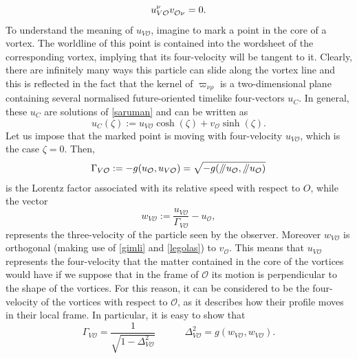 \documentclass[usenatbib%
]{mnras}
\newcommand{\spc}{\quad \quad \quad}
\newcommand{\paral}{\mathbin{ \, \!/\mkern-5mu/\!} \,}
\begin{document}
\begin{equation}\label{legolas}
u_{V{\mathcal{O}}}^\nu v\indices{_{\mathcal{O}} _\nu}=0.
\end{equation}
To understand the meaning of $u_{V{\mathcal{O}}}$, imagine to mark a point in the core of a vortex. The worldline of this point is contained into the wordsheet of the corresponding vortex, implying that its four-velocity will be tangent to it. Clearly, there are infinitely many ways this particle can slide along the vortex line and this is reflected in the fact that the kernel of $\varpi_{\nu \rho}$ is a two-dimensional plane containing several normalised future-oriented timelike four-vectors $u_{C}$. In general, these $u_{C}$ are solutions of \eqref{saruman} and can be written as
\begin{equation}
u_{C}(\zeta) := u_{V{\mathcal{O}}} \cosh(\zeta) + v_{\mathcal{O}}\sinh(\zeta).
\end{equation}
Let us impose that the marked point is moving with four-velocity $u_{V{\mathcal{O}}}$, which is the case $\zeta =0$. Then,
\begin{equation}\label{brillantino}
\Gamma_{V{\mathcal{O}}} := -g(u_{\mathcal{O}},u_{V{\mathcal{O}}}) = \sqrt{-g(\paral u_{\mathcal{O}},\paral u_{\mathcal{O}})} 
\end{equation} 
is the Lorentz factor associated with its relative speed with respect to $O$, while the vector
\begin{equation}\label{3velocity}
w_{V{\mathcal{O}}} := \dfrac{u_{V{\mathcal{O}}}}{\Gamma_{V{\mathcal{O}}}} - u_{\mathcal{O}},
\end{equation}
represents the three-velocity of the particle seen by the observer. Moreover  $w_{V{\mathcal{O}}}$ is orthogonal (making use of \eqref{gimli} and \eqref{legolas}) to $v_{\mathcal{O}}$. 
This means that $u_{V{\mathcal{O}}}$ represents the four-velocity that the matter contained in the core of the vortices would have if we suppose that in the frame of $\mathcal{O}$ its motion is perpendicular to the shape of the vortices. 
For this reason, it can be considered to be the four-velocity of the vortices with respect to $\mathcal{O}$, as it describes how their profile moves in their local frame. 
In particular, it is easy to show that
\begin{equation}
\Gamma_{V{\mathcal{O}}} = \dfrac{1}{\sqrt{1-\Delta_{V{\mathcal{O}}}^2}} \spc  \Delta_{V{\mathcal{O}}}^2 = g(w_{V{\mathcal{O}}},w_{V{\mathcal{O}}}).
\end{equation}
%
\end{document}
